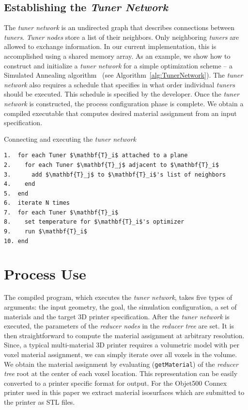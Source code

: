 \subsection{Establishing the \emph{Tuner Network}}

The \emph{tuner network} is an undirected graph that describes connections between \emph{tuners}. \emph{Tuner nodes} store a list of their neighbors. Only neighboring \emph{tuners} are allowed to exchange information. In our current implementation, this is accomplished using a shared memory array. As an example, we show how to construct and initialize a \emph{tuner network} for a simple optimization scheme -- a Simulated Annealing algorithm~\cite{Van:1987} (see Algorithm~\ref{alg:TunerNetwork}). The \emph{tuner network} also requires a schedule that specifies in what order individual \emph{tuners} should be executed. This schedule is specified by the developer. Once the \emph{tuner network} is constructed, the process configuration phase is complete. We obtain a compiled executable that computes desired material assignment from an input specification.
\begin{algorithm}
\caption{Connecting and executing the \emph{tuner network}}
\label{alg:TunerNetwork}
\begin{lstlisting}[mathescape=true]
1.  for each Tuner $\mathbf{T}_i$ attached to a plane
2.    for each Tuner $\mathbf{T}_j$ adjacent to $\mathbf{T}_i$
3.      add $\mathbf{T}_j$ to $\mathbf{T}_i$'s list of neighbors
4.    end
5.  end
6.  iterate N times
7.  for each Tuner $\mathbf{T}_i$
8.    set temperature for $\mathbf{T}_i$'s optimizer
9.    run $\mathbf{T}_i$
10. end
\end{lstlisting}
\end{algorithm} 
\section{Process Use}
\label{sec:use}
The compiled program, which executes the \emph{tuner network}, takes five types of arguments: the input geometry, the goal, the simulation configuration, a set of materials and the target 3D printer specification. 
After the \emph{tuner network} is executed, the parameters of the \emph{reducer nodes} in the \emph{reducer tree} are set. It is then straightforward to compute the material assignment at arbitrary resolution. Since, a typical multi-material 3D printer requires a volumetric model with per voxel material assignment, we can simply iterate over all voxels in the volume. We obtain the material assignment by evaluating (\verb|getMaterial|) of the \emph{reducer tree} root at the center of each voxel location. This representation can be easily converted to a printer specific format for output. For the Objet500 Connex printer used in this paper we extract material isosurfaces which are submitted to the printer as STL files. 